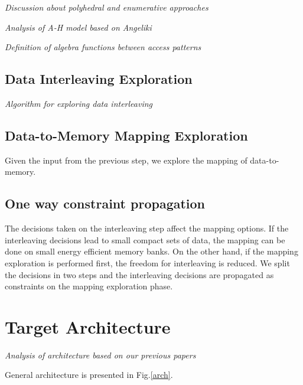 \documentclass[prodmode,acmtodaes]{acmsmall}
\begin{document}
\textit{Discussion about polyhedral and enumerative approaches}

\textit{Analysis of A-H model based on Angeliki}

\textit{Definition of algebra functions between access patterns}

\subsection{Data Interleaving Exploration}

\textit{Algorithm for exploring data interleaving}

\subsection{Data-to-Memory Mapping Exploration}

Given the input from the previous step, we explore the mapping of data-to-memory.

\subsection{One way constraint propagation}

The decisions taken on the interleaving step affect the mapping options.
If the interleaving decisions lead to small compact sets of data, the mapping can be done on small energy efficient memory banks.
On the other hand, if the mapping exploration is performed first, the freedom for interleaving is reduced.
We split the decisions in two steps and the interleaving decisions are propagated as constraints on the mapping exploration phase. 

\section{Target Architecture}

\textit{Analysis of architecture based on our previous papers}

General architecture is presented in Fig.\ref{arch}.
\end{document}
